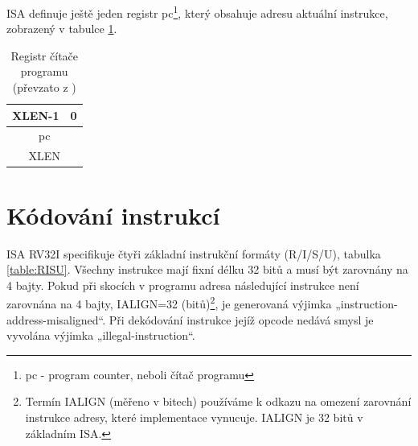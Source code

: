 \documentclass[FM,BP]{tulthesis}
\begin{document}
ISA definuje ještě jeden registr pc\footnote{pc - program counter, neboli čítač programu}, který obsahuje adresu aktuální instrukce, zobrazený v tabulce \ref{table:pc}. 

\begin{table}[h]
    \caption{Registr čítače programu (převzato z \cite{RISC-V})}
    \label{table:pc}
    \begin{center}
        \begin{tabular}{lr}
        XLEN-1 & 0 \\
        \hline
        \multicolumn{2}{|c|}{pc}
        \\
        \hline
        \multicolumn{2}{c}{XLEN}
        \end{tabular}
    \end{center}
\end{table}

\section{Kódování instrukcí} \label{kap:immediate}
ISA RV32I specifikuje čtyři základní instrukční formáty (R/I/S/U), tabulka \ref{table:RISU}. Všechny instrukce mají fixní délku 32 bitů a musí být zarovnány na 4 bajty. 
Pokud při skocích v programu adresa následující instrukce není zarovnána na 4 bajty, IALIGN=32 (bitů)\footnote{Termín IALIGN (měřeno v bitech) používáme k odkazu na omezení zarovnání instrukce adresy, které implementace vynucuje. IALIGN je 32 bitů v základním ISA.}, je generovaná výjimka „instruction-address-misaligned“.
Při dekódování instrukce jejíž opcode nedává smysl je vyvolána výjimka „illegal-instruction“.
\end{document}
